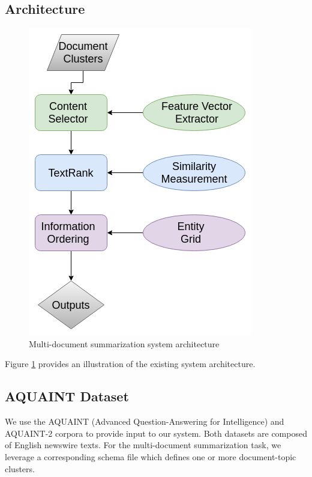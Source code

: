 \documentclass[11pt]{article}
\begin{document}
\subsection{Architecture}
\begin{figure}
  \includegraphics[width=\linewidth]{arch_D3.png}
  \caption{Multi-document summarization system architecture}
  \label{fig:arch}
\end{figure}

Figure \ref{fig:arch} provides an illustration of the existing system architecture.

\subsection{AQUAINT Dataset}
We use the AQUAINT (Advanced Question-Answering for Intelligence) and AQUAINT-2 corpora to provide input to our system. Both datasets are composed of English newswire texts. For the multi-document summarization task, we leverage a corresponding schema file which defines one or more document-topic clusters. 
\end{document}
